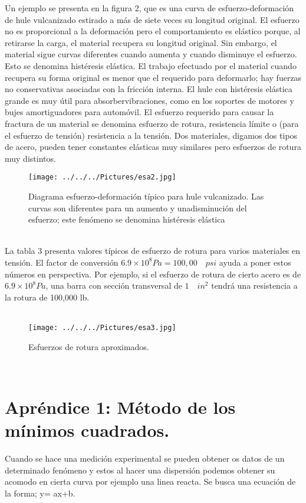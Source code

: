 \documentclass[11pt,a4paper]{article}
\begin{document}
Un ejemplo se presenta en la figura 2, que es una curva de esfuerzo-deformaci\'{o}n de hule vulcanizado estirado a m\'{a}s de siete veces su longitud original. El esfuerzo no es proporcional a la deformaci\'{o}n pero el comportamiento es el\'{a}stico porque, al retirarse la carga, el material recupera su longitud original. Sin embargo, el material sigue curvas diferentes cuando aumenta y cuando disminuye el esfuerzo. Esto se denomina hist\'{e}resis el\'{a}stica. El trabajo efectuado por el material cuando recupera su forma original es menor que el requerido para deformarlo; hay fuerzas no conservativas asociadas con la fricci\'{o}n interna. El hule con hist\'{e}resis el\'{a}stica grande es muy \'{u}til para absorbervibraciones, como en los soportes de motores y bujes amortiguadores para  autom\'{o}vil. El esfuerzo requerido para causar la fractura de un material se denomina esfuerzo de rotura, resistencia l\'{i}mite o (para el esfuerzo de tensi\'{o}n) resistencia a la tensi\'{o}n. Dos materiales, digamos dos tipos de acero, pueden tener constantes el\'{a}sticas muy similares pero esfuerzos de rotura muy distintos. 
\\
\begin{figure}[hbtp]
\centering
\texttt{[image: ../../../Pictures/esa2.jpg]}
\caption{ Diagrama esfuerzo-deformaci\'{o}n t\'{i}pico para hule vulcanizado. Las curvas son diferentes para un aumento y unadisminuci\'{o}n del esfuerzo; este fen\'{o}meno se denomina hist\'{e}resis el\'{a}stica}
\end{figure}
\\
La tabla 3 presenta valores t\'{i}picos de esfuerzo de rotura para varios materiales en tensi\'{o}n. El factor de conversi\'{o}n $6.9\times { 10 }^{ 8 }Pa=100,00\quad psi$ ayuda a poner estos n\'{u}meros en perspectiva. Por ejemplo, si el esfuerzo de rotura de cierto acero es de $6.9\times { 10 }^{ 8 }Pa$, una barra con secci\'{o}n transversal de $1\quad { in }^{ 2 }$ tendr\'{a} una resistencia a la rotura de 100,000 lb.\\
\\
\begin{figure}[hbtp]
\caption{Esfuerzos de rotura
aproximados.}
\centering
\texttt{[image: ../../../Pictures/esa3.jpg]}
\end{figure}
\\

\section*{Apr\'{e}ndice 1: M\'{e}todo de los m\'{i}nimos cuadrados.}
Cuando se hace una medici\'{o}n experimental se pueden obtener os datos de un determinado fen\'{o}meno y estos al hacer una dispersi\'{o}n podemos obtener su acomodo en cierta curva por ejemplo una linea reacta. Se busca una  ecuaci\'{o}n de la forma; y= ax+b.\\
\end{document}
